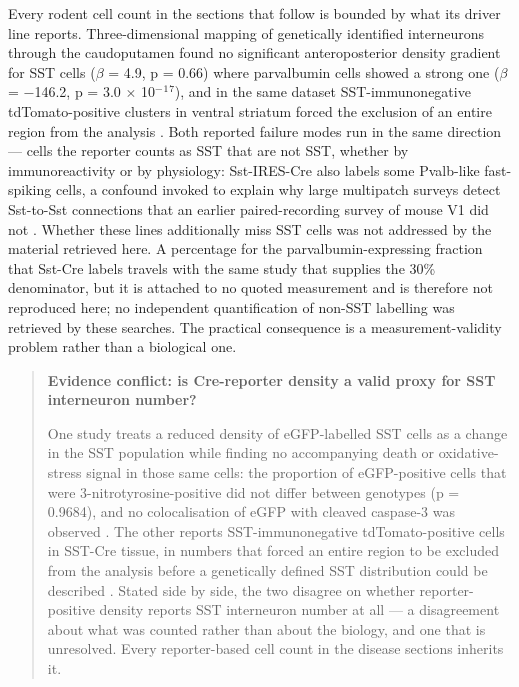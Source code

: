 \documentclass[11pt]{article}
\begin{document}
Every rodent cell count in the sections that follow is bounded by what its driver line reports. Three-dimensional mapping of genetically identified interneurons through the caudoputamen found no significant anteroposterior density gradient for SST cells ($\beta$ = 4.9, p = 0.66) where parvalbumin cells showed a strong one ($\beta$ = $-$146.2, p = 3.0 $\times$ 10$^{-}$$^{1}$$^{7}$), and in the same dataset SST-immunonegative tdTomato-positive clusters in ventral striatum forced the exclusion of an entire region from the analysis \citep{Muhsinov2026}. Both reported failure modes run in the same direction --- cells the reporter counts as SST that are not SST, whether by immunoreactivity or by physiology: Sst-IRES-Cre also labels some Pvalb-like fast-spiking cells, a confound invoked to explain why large multipatch surveys detect Sst-to-Sst connections that an earlier paired-recording survey of mouse V1 did not \citep{Campagnola2022,Pfeffer2013}. Whether these lines additionally miss SST cells was not addressed by the material retrieved here. A percentage for the parvalbumin-expressing fraction that Sst-Cre labels travels with the same study that supplies the 30\% denominator, but it is attached to no quoted measurement and is therefore not reproduced here; no independent quantification of non-SST labelling was retrieved by these searches. The practical consequence is a measurement-validity problem rather than a biological one.

\begin{quote}
\noindent\textbf{Evidence conflict: is Cre-reporter density a valid proxy for SST interneuron number?}\par
One study treats a reduced density of eGFP-labelled SST cells as a change in the SST population while finding no accompanying death or oxidative-stress signal in those same cells: the proportion of eGFP-positive cells that were 3-nitrotyrosine-positive did not differ between genotypes (p = 0.9684), and no colocalisation of eGFP with cleaved caspase-3 was observed \citep{Drake2024}. The other reports SST-immunonegative tdTomato-positive cells in SST-Cre tissue, in numbers that forced an entire region to be excluded from the analysis before a genetically defined SST distribution could be described \citep{Muhsinov2026}. Stated side by side, the two disagree on whether reporter-positive density reports SST interneuron number at all --- a disagreement about what was counted rather than about the biology, and one that is unresolved. Every reporter-based cell count in the disease sections inherits it.

\end{quote}
\end{document}
